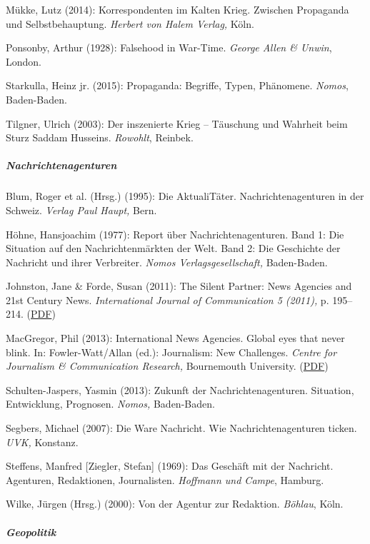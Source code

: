 Mükke, Lutz (2014): Korrespondenten im Kalten Krieg. Zwischen Propaganda
und Selbstbehauptung. \emph{Herbert von Halem Verlag,} Köln.

Ponsonby, Arthur (1928): Falsehood in War-Time. \emph{George Allen \&
Unwin}, London.

Starkulla, Heinz jr. (2015): Propaganda: Begriffe, Typen, Phänomene.
\emph{Nomos}, Baden-Baden.

Tilgner, Ulrich (2003): Der inszenierte Krieg -- Täuschung und Wahrheit
beim Sturz Saddam Husseins. \emph{Rowohlt}, Reinbek.

\hypertarget{nachrichtenagenturen-1}{%
\subparagraph{\texorpdfstring{\textbf{Nachrichtenagenturen}}{Nachrichtenagenturen}}\label{nachrichtenagenturen-1}}

Blum, Roger et al. (Hrsg.) (1995): Die AktualiTäter.
Nachrichtenagenturen in der Schweiz. \emph{Verlag Paul Haupt,} Bern.

Höhne, Hansjoachim (1977): Report über Nachrichtenagenturen. Band 1: Die
Situation auf den Nachrichtenmärkten der Welt. Band 2: Die Geschichte
der Nachricht und ihrer Verbreiter. \emph{Nomos Verlagsgesellschaft,}
Baden-Baden.

Johnston, Jane \& Forde, Susan (2011): The Silent Partner: News Agencies
and 21st Century News. \emph{International Journal of Communication 5
(2011),} p. 195--214.
(\href{http://ijoc.org/index.php/ijoc/article/view/928/519}{PDF})

MacGregor, Phil (2013): International News Agencies. Global eyes that
never blink. In: Fowler-Watt/Allan (ed.): Journalism: New Challenges.
\emph{Centre for Journalism \& Communication Research,} Bournemouth
University.
(\href{https://microsites.bournemouth.ac.uk/cjcr/files/2013/10/JNC-2013-Chapter-3-MacGregor.pdf}{PDF})

Schulten-Jaspers, Yasmin (2013): Zukunft der Nachrichtenagenturen.
Situation, Entwicklung, Prognosen. \emph{Nomos,} Baden-Baden.

Segbers, Michael (2007): Die Ware Nachricht. Wie Nachrichtenagenturen
ticken. \emph{UVK,} Konstanz.

Steffens, Manfred {[}Ziegler, Stefan{]} (1969): Das Geschäft mit der
Nachricht. Agenturen, Redaktionen, Journalisten. \emph{Hoffmann und
Campe}, Hamburg.

Wilke, Jürgen (Hrsg.) (2000): Von der Agentur zur Redaktion.
\emph{Böhlau}, Köln.

\hypertarget{geopolitik}{%
\subparagraph{\texorpdfstring{\textbf{Geopolitik}}{Geopolitik}}\label{geopolitik}}

